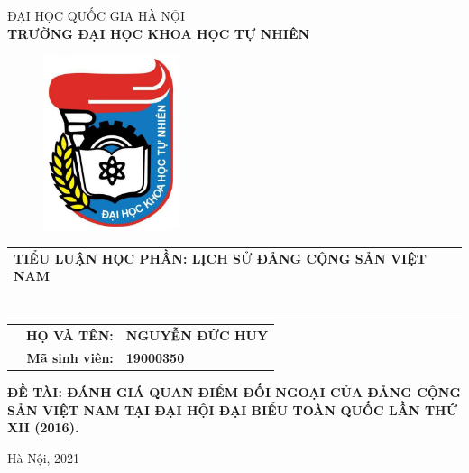 \documentclass[12pt]{article}
\title{}
\begin{document}
\fancyhf{}
\lhead{}
\chead{\thepage}
\rhead{}
\cfoot{}
\rfoot{}
\lfoot{}
\pagestyle{fancy}
\renewcommand{\headrulewidth}{0pt}
\renewcommand{\footrulewidth}{0pt}
\begin{titlepage}
    \begin{center}
        ĐẠI HỌC QUỐC GIA HÀ NỘI \\
        \textbf{TRƯỜNG ĐẠI HỌC KHOA HỌC TỰ NHIÊN} \\
    \end{center}

    \vspace{1cm}

    \begin{figure}[h!]
        \begin{center}
            \includegraphics[width=4cm]{HUS.jpg}
        \end{center}
    \end{figure}

    \begin{center}
        \begin{tabular}{c}
            \multicolumn{1}{l}{\normalsize \textbf{TIỂU LUẬN HỌC PHẦN: LỊCH SỬ ĐẢNG CỘNG SẢN VIỆT NAM }} \\
            ~~                                                                                           \\
        \end{tabular}
        \begin{table}[H]
            \centering
            \begin{tabular}{rrl}
                \hspace{2cm} & \normalsize \textbf{HỌ VÀ TÊN:}    & \normalsize \textbf{NGUYỄN ĐỨC HUY} \\
                             & \normalsize \textbf{Mã sinh viên:} & \normalsize \textbf{19000350}       \\
            \end{tabular}
        \end{table}
    \end{center}
    \textbf{\large ĐỀ TÀI: ĐÁNH GIÁ QUAN ĐIỂM ĐỐI NGOẠI CỦA ĐẢNG CỘNG SẢN VIỆT NAM TẠI ĐẠI HỘI ĐẠI BIỂU TOÀN QUỐC LẦN THỨ XII (2016).}

    \vspace{1.5cm}
    \normalsize \centering Hà Nội, 2021
\end{titlepage}
\end{document}

